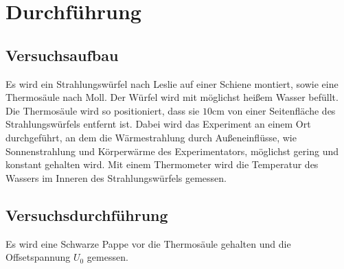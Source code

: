 \section{Durchführung}
\label{sec:Durchführung}
\subsection{Versuchsaufbau}
Es wird ein Strahlungswürfel nach Leslie auf einer Schiene montiert, sowie eine
Thermosäule nach Moll. Der Würfel wird mit möglichst heißem Wasser befüllt. Die
Thermosäule wird so positioniert, dass sie $10\si{\centi\meter}$ von einer
Seitenfläche des Strahlungswürfels entfernt ist. Dabei wird das Experiment an
einem Ort durchgeführt, an dem die Wärmestrahlung durch Außeneinflüsse, wie
Sonnenstrahlung und Körperwärme des Experimentators, möglichst gering und konstant
gehalten wird. Mit einem Thermometer wird die Temperatur des Wassers im Inneren
des Strahlungswürfels gemessen.

\subsection{Versuchsdurchführung}
Es wird eine Schwarze Pappe vor die Thermosäule gehalten und die Offsetspannung
$U_0$ gemessen.
